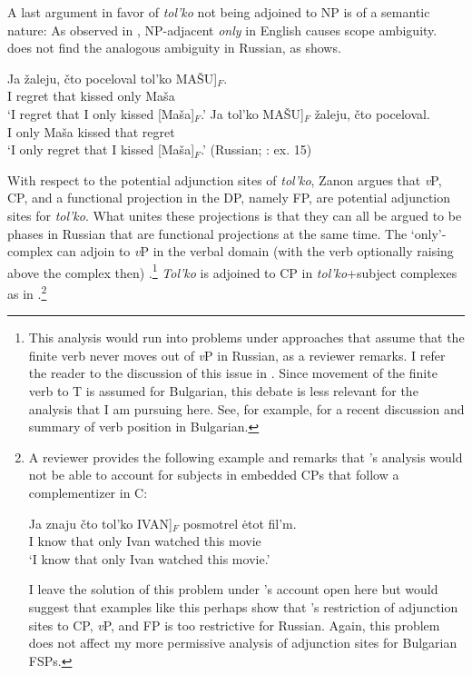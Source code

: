 \documentclass[output=paper,colorlinks,citecolor=brown]{langscibook}
\begin{document}
\largerpage
\noindent A last argument in favor of \textit{tol'ko} not being adjoined to NP is of a semantic nature: As observed in \citet{Taglicht1984}, NP-adjacent \textit{only} in English causes scope ambiguity. \citet[423-424]{Zanon2018} does not find the analogous ambiguity in Russian, as  shows.  

\ea\label{Zanon:basic4} 
\ea
\gll Ja \v{z}aleju, \v{c}to poceloval tol'ko \minsp{[} MA\v{S}U]$_{F}$. \\
I regret that kissed only {} Ma\v{s}a \\
\glt `I regret that I only kissed [Ma\v{s}a]$_{F}$.’ 
\z 
\ex
\gll Ja tol'ko \minsp{[} MA\v{S}U]$_{F}$ \v{z}aleju, \v{c}to poceloval. \\
I only {} Ma\v{s}a kissed that regret \\
\glt `I only regret that I kissed [Ma\v{s}a]$_{F}$.’
\z
\z
\hfill (Russian; \citealt{Zanon2018}: ex. 15)
\z  

\noindent With respect to the potential adjunction sites of \textit{tol'ko}, Zanon argues that \textit{v}P, CP, and a functional projection in the DP, namely FP, are potential adjunction sites for \textit{tol'ko}. What unites these projections is that they can all be argued to be phases in Russian that are functional projections at the same time. The `only'-complex can adjoin to \textit{v}P in the verbal domain (with the verb optionally raising above the complex then) \citep[426-427]{Zanon2018}.\footnote{This analysis would run into problems under approaches that assume that the finite verb never moves out of \textit{v}P in Russian, as a reviewer remarks. I refer the reader to the discussion of this issue in \citet{Zanon2018}. Since movement of the finite verb to T is assumed for Bulgarian, this debate is less relevant for the analysis that I am pursuing here. See, for example, \citet{Harizanov2019} for a recent discussion and summary of verb position in Bulgarian.} \textit{Tol'ko} is adjoined to CP in \textit{tol'ko}+subject complexes as in  \citep[429]{Zanon2018}.\footnote{A reviewer provides the following example and remarks that \citeauthor{Zanon2018}'s analysis would not be able to account for subjects in embedded CPs that follow a complementizer in C: 

\ea  
\gll Ja znaju čto tol'ko \minsp{[} IVAN]$_{F}$ posmotrel {\.e}tot fil'm. \\
I know that only {} Ivan watched this movie \\
\glt `I know that only Ivan watched this movie.'
\z 

\noindent I leave the solution of this problem under \citeauthor{Zanon2018}'s account open here but would suggest that examples like this perhaps show that \citeauthor{Zanon2018}'s restriction of adjunction sites to CP, \textit{v}P, and FP is too restrictive for Russian. Again, this problem does not affect my more permissive analysis of adjunction sites for Bulgarian FSPs.} 
\end{document}
